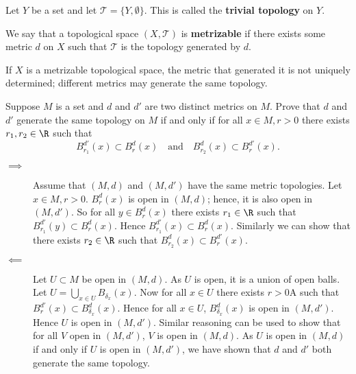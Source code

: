 \begin{example}
	Let $Y$ be a set and let $\mathcal T = \{ Y, \emptyset \}$.
	This is called the \textbf{trivial topology} on $Y$.
\end{example}

\begin{definition}[Metrizable]
	We say that a topological space $(X, \mathcal T)$ is \textbf{metrizable} if
	there exists some metric $d$ on $X$ such that $\mathcal T$ is the topology
	generated by $d$.
\end{definition}

\begin{remark}
	If $X$ is a metrizable topological space, the metric that generated it is
	not uniquely determined; different metrics may generate the same topology.
\end{remark}

\begin{problem}
	\label{prob:metrics-generate-topologies}
	Suppose $M$ is a set and $d$ and $d'$ are two distinct metrics on $M$.
	Prove that $d$ and $d'$ generate the same topology on $M$ if and only if 
	for all $x \in M, r > 0$ there exists $r_1, r_2 \in \R$ such that
	\[
		B_{r_1}^{d'}(x) \subset B_r^d(x)
		\quad\text{and}\quad
		B_{r_2}^d(x) \subset B_r^{d'}(x).
	\]
\end{problem}

\begin{solution}
	\hfill
	\begin{description}
		\item[$\implies$] 
			Assume that $(M,d)$ and $(M,d')$ have the same metric topologies. 
			Let $x \in M, r > 0$. $B_r^d(x)$ is open in $(M,d)$; hence,
			it is also open in $(M,d')$. 
			So for all $y \in B_r^d(x)$ 
			there exists $r_1 \in \R$
			such that $B_{r_1}^{d'}(y) \subset B_r^d(x)$.
			Hence $B_{r_1}^{d'}(x) \subset B_r^d(x)$.
			Similarly we can show that there exists $r_2 \in \R$
			such that $B_{r_2}^d(x) \subset B_r^{d'}(x)$.

		\item[$\impliedby$] 
			Let $U \subset M$ be open in $(M,d)$.
			As $U$ is open, it is a union of open balls.
			Let $U = \bigcup_{x \in U} B_{\delta_x} (x)$.
			Now for all $x \in U$ there exists $r > 0$A such that
			$B_r^{d'}(x) \subset B_{\delta_x}^d(x)$.
			Hence for all $x \in U$, $B_{\delta_x}^d(x)$ is open in $(M,d')$.
			Hence $U$ is open in $(M,d')$.
			Similar reasoning can be used to show that for all $V$ open in
			$(M,d')$, $V$ is open in $(M,d)$.
			As $U$ is open in $(M,d)$ if and only if $U$ is open in $(M,d')$,
			we have shown that $d$ and $d'$ both generate the same topology.
	\end{description}
\end{solution}

